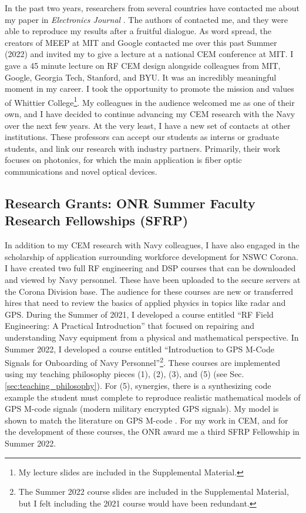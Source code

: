 \documentclass[../../../main.tex]{subfiles}
\begin{document}
In the past two years, researchers from several countries have contacted me about my paper in \textit{Electronics Journal}  \cite{electronics10040415}.  The authors of \cite{10.3390/electronics8121506} contacted me, and they were able to reproduce my results after a fruitful dialogue.  As word spread, the creators of MEEP at MIT and Google contacted me over this past Summer (2022) and invited my to give a lecture at a national CEM conference at MIT.  I gave a 45 minute lecture on RF CEM design alongside colleagues from MIT, Google, Georgia Tech, Stanford, and BYU.  It was an incredibly meaningful moment in my career.  I took the opportunity to promote the mission and values of Whittier College\footnote{My lecture slides are included in the Supplemental Material.}.  My colleagues in the audience welcomed me as one of their own, and I have decided to continue advancing my CEM research with the Navy over the next few years.  At the very least, I have a new set of contacts at other institutions.  These professors can accept our students as interns or graduate students, and link our research with industry partners.  Primarily, their work focuses on photonics, for which the main application is fiber optic communications and novel optical devices.

\subsection{Research Grants: ONR Summer Faculty Research Fellowships (SFRP)}
\label{sec:fellow}

In addition to my CEM research with Navy colleagues, I have also engaged in the scholarship of application surrounding workforce development for NSWC Corona.  I have created two full RF engineering and DSP courses that can be downloaded and viewed by Navy personnel.  These have been uploaded to the secure servers at the Corona Division base.  The audience for these courses are new or transferred hires that need to review the basics of applied physics in topics like radar and GPS.  During the Summer of 2021, I developed a course entitled ``RF Field Engineering: A Practical Introduction'' that focused on repairing and understanding Navy equipment from a physical and mathematical perspective.  In Summer 2022, I developed a course entitled ``Introduction to GPS M-Code Signals for Onboarding of Navy Personnel''\footnote{The Summer 2022 course slides are included in the Supplemental Material, but I felt including the 2021 course would have been redundant.}.  These courses are implemented using my teaching philosophy pieces (1), (2), (3), and (5) (see Sec. \ref{sec:teaching_philosophy}).  For (5), synergies, there is a synthesizing code example the student must complete to reproduce realistic mathematical models of GPS M-code signals (modern military encrypted GPS signals).  My model is shown to match the literature on GPS M-code \cite{mcode}.  For my work in CEM, and for the development of these courses, the ONR award me a third SFRP Fellowship in Summer 2022.
\end{document}
